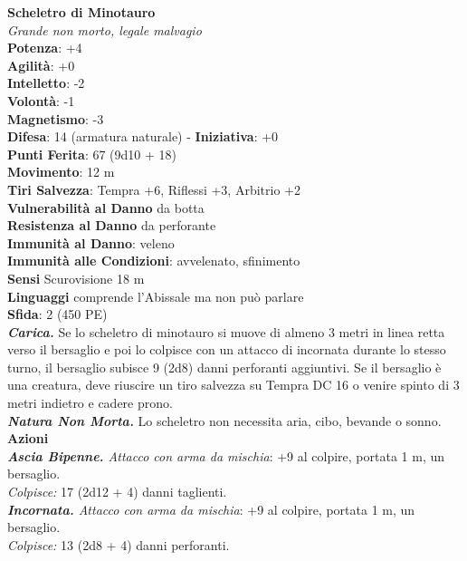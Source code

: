 \begin{multicols}{2}
\medskip\textbf{Scheletro di Minotauro}\\
\emph{Grande non morto, legale malvagio}\\
\textbf{Potenza}: +4\\
\textbf{Agilità}: +0\\
\textbf{Intelletto}: -2\\
\textbf{Volontà}: -1\\
\textbf{Magnetismo}: -3\\
\textbf{Difesa}: 14 (armatura naturale) - \textbf{Iniziativa}: +0\\
\textbf{Punti Ferita}: 67 (9d10 + 18)\\
\textbf{Movimento}: 12 m\\
\textbf{Tiri Salvezza}: Tempra +6, Riflessi +3, Arbitrio +2\\
\textbf{Vulnerabilità al Danno} da botta\\
\textbf{Resistenza al Danno} da perforante\\
\textbf{Immunità al Danno}: veleno\\
\textbf{Immunità alle Condizioni}: avvelenato, sfinimento\\
\textbf{Sensi} Scurovisione 18 m\\
\textbf{Linguaggi} comprende l'Abissale ma non può parlare\\
\textbf{Sfida}: 2 (450 PE)\smallskip\\
\emph{\textbf{Carica.}} Se lo scheletro di minotauro si muove di almeno 3 metri in linea retta verso il bersaglio e poi lo colpisce con un attacco di incornata durante lo stesso turno, il bersaglio subisce 9 (2d8) danni perforanti aggiuntivi. Se il bersaglio è una creatura, deve riuscire un tiro salvezza su Tempra DC  16 o venire spinto di 3 metri indietro e cadere prono.\\
\emph{\textbf{Natura Non Morta.}} Lo scheletro non necessita aria, cibo, bevande o sonno.\\
\smallskip\textbf{Azioni}\\
\emph{\textbf{Ascia Bipenne.} Attacco con arma da mischia}: +9 al colpire, portata 1 m, un bersaglio.\\
\emph{Colpisce:} 17 (2d12 + 4) danni taglienti.\\
\emph{\textbf{Incornata.} Attacco con arma da mischia}: +9 al colpire, portata 1 m, un bersaglio.\\
\emph{Colpisce:} 13 (2d8 + 4) danni perforanti.\\


\end{multicols}
